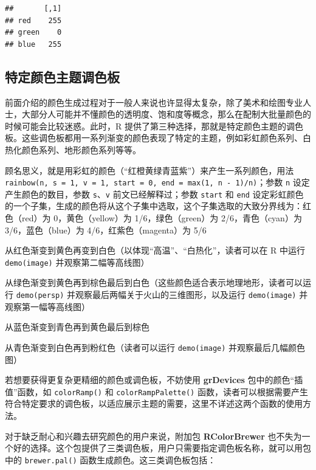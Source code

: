 \documentclass[
  b5paper,
  UTF8,twoside]{book}
\providecommand{\tightlist}{%
  \setlength{\itemsep}{0pt}\setlength{\parskip}{0pt}}
\begin{document}
\begin{verbatim}
##       [,1]
## red    255
## green    0
## blue   255
\end{verbatim}

\hypertarget{subsec:palette}{%
\subsection{特定颜色主题调色板}\label{subsec:palette}}

前面介绍的颜色生成过程对于一般人来说也许显得太复杂，除了美术和绘图专业人士，大部分人可能并不懂颜色的透明度、饱和度等概念，那么在配制大批量颜色的时候可能会比较迷惑。此时，R 提供了第三种选择，那就是特定颜色主题的调色板。这些调色板都用一系列渐变的颜色表现了特定的主题，例如彩虹颜色系列、白热化颜色系列、地形颜色系列等等。

\begin{description}
\tightlist
\item[\texttt{rainbow()}]
顾名思义，就是用彩虹的颜色（``红橙黄绿青蓝紫''）来产生一系列颜色，用法 \texttt{rainbow(n,\ s\ =\ 1,\ v\ =\ 1,\ start\ =\ 0,\ end\ =\ max(1,\ n\ -\ 1)/n)}；参数 \texttt{n} 设定产生颜色的数目，参数 \texttt{s}、\texttt{v} 前文已经解释过；参数 \texttt{start} 和 \texttt{end} 设定彩虹颜色的一个子集，生成的颜色将从这个子集中选取，这个子集选取的大致分界线为：红色（red）为 0，黄色（yellow）为 1/6，绿色（green）为 2/6，青色（cyan）为 3/6，蓝色（blue）为 4/6，红紫色（magenta）为 5/6
\item[\texttt{heat.colors()}]
从红色渐变到黄色再变到白色（以体现``高温''、``白热化''，读者可以在 R 中运行 \texttt{demo(image)} 并观察第二幅等高线图）
\item[\texttt{terrain.colors()}]
从绿色渐变到黄色再到棕色最后到白色（这些颜色适合表示地理地形，读者可以运行 \texttt{demo(persp)} 并观察最后两幅关于火山的三维图形，以及运行 \texttt{demo(image)} 并观察第一幅等高线图）
\item[\texttt{topo.colors()}]
从蓝色渐变到青色再到黄色最后到棕色
\item[\texttt{cm.colors()}]
从青色渐变到白色再到粉红色（读者可以运行 \texttt{demo(image)} 并观察最后几幅颜色图）
\end{description}

若想要获得更复杂更精细的颜色或调色板，不妨使用 \textbf{grDevices} 包中的颜色``插值''函数，如 \texttt{colorRamp()} 和 \texttt{colorRampPalette()} 函数，读者可以根据需要产生符合特定要求的调色板，以适应展示主题的需要，这里不详述这两个函数的使用方法。

对于缺乏耐心和兴趣去研究颜色的用户来说，附加包 \textbf{RColorBrewer}\citep{RColorBrewer} 也不失为一个好的选择。这个包提供了三类调色板，用户只需要指定调色板名称，就可以用包中的 \texttt{brewer.pal()} 函数生成颜色。这三类调色板包括：
\end{document}
